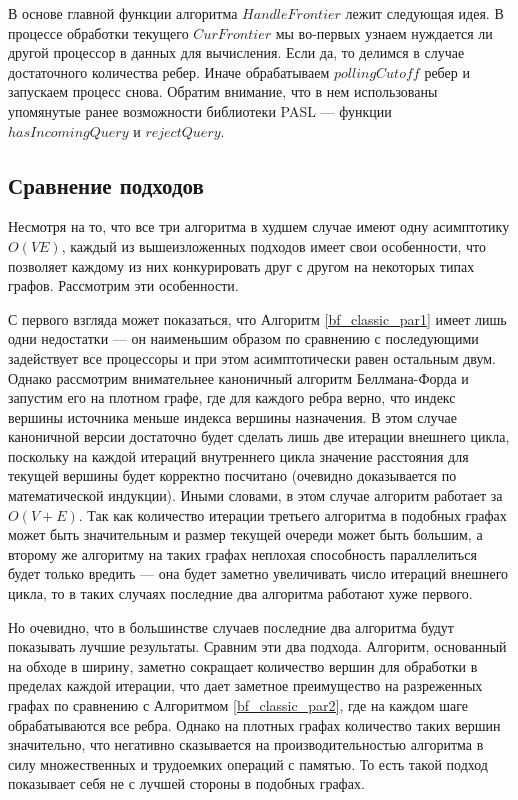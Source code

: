 В основе главной функции алгоритма $HandleFrontier$ лежит следующая идея. В процессе обработки текущего $CurFrontier$ мы во-первых узнаем нуждается ли другой процессор в данных для вычисления. Если да, то делимся в случае достаточного количества ребер. Иначе обрабатываем $pollingCutoff$ ребер и запускаем процесс снова. Обратим внимание, что в нем использованы упомянутые ранее возможности библиотеки PASL --- функции $hasIncomingQuery$ и $rejectQuery$. 

\FloatBarrier
\subsection{Сравнение подходов}
Несмотря на то, что все три алгоритма в худшем случае имеют одну асимптотику  $O(VE)$, каждый из вышеизложенных подходов имеет свои особенности, что позволяет каждому из них конкурировать друг с другом на некоторых типах графов. Рассмотрим эти особенности.

С первого взгляда может показаться, что Алгоритм \ref{bf_classic_par1} имеет лишь одни недостатки --- он наименьшим образом по сравнению с последующими задействует все процессоры и при этом асимптотически равен остальным двум. Однако рассмотрим внимательнее каноничный алгоритм Беллмана-Форда и запустим его на плотном графе, где для каждого ребра верно, что индекс вершины источника меньше индекса вершины назначения. В этом случае каноничной версии достаточно будет сделать лишь две итерации внешнего цикла, поскольку на каждой итераций внутреннего цикла значение расстояния для текущей вершины будет корректно посчитано (очевидно доказывается по математической индукции). Иными словами, в этом случае алгоритм работает за $O(V + E)$. Так как количество итерации третьего алгоритма в подобных графах может быть значительным и размер текущей очереди может быть большим, а второму же алгоритму на таких графах неплохая способность параллелиться будет только вредить --- она будет заметно увеличивать число итераций внешнего цикла, то в таких случаях последние два алгоритма работают хуже первого.   

Но очевидно, что в большинстве случаев последние два алгоритма будут показывать лучшие результаты. Сравним эти два подхода. Алгоритм, основанный на обходе в ширину, заметно сокращает количество вершин для обработки в пределах каждой итерации, что дает заметное преимущество на разреженных графах по сравнению с Алгоритмом \ref{bf_classic_par2}, где на каждом шаге обрабатываются все ребра. Однако на плотных графах количество таких вершин значительно, что негативно сказывается на производительностью алгоритма в силу множественных и трудоемких операций с памятью. То есть такой подход показывает себя не с лучшей стороны в подобных графах.  


